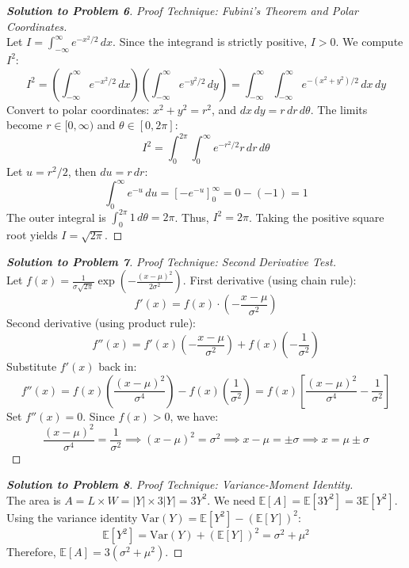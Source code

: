\documentclass[11pt, a4paper]{article}
\theoremstyle{definition}
\theoremstyle{remark}
\newcommand{\E}{\mathbb{E}}
\begin{document}
\begin{proof}[\textbf{Solution to Problem 6}]
\textit{Proof Technique: Fubini's Theorem and Polar Coordinates.} \\
Let $I = \int_{-\infty}^{\infty} e^{-x^2/2} \, dx$. Since the integrand is strictly positive, $I > 0$. We compute $I^2$:
\[ I^2 = \left( \int_{-\infty}^{\infty} e^{-x^2/2} \, dx \right) \left( \int_{-\infty}^{\infty} e^{-y^2/2} \, dy \right) = \int_{-\infty}^{\infty} \int_{-\infty}^{\infty} e^{-(x^2+y^2)/2} \, dx \, dy \]
Convert to polar coordinates: $x^2 + y^2 = r^2$, and $dx \, dy = r \, dr \, d\theta$. The limits become $r \in [0, \infty)$ and $\theta \in [0, 2\pi]$:
\[ I^2 = \int_{0}^{2\pi} \int_{0}^{\infty} e^{-r^2/2} r \, dr \, d\theta \]
Let $u = r^2/2$, then $du = r \, dr$:
\[ \int_{0}^{\infty} e^{-u} \, du = \left[ -e^{-u} \right]_0^\infty = 0 - (-1) = 1 \]
The outer integral is $\int_{0}^{2\pi} 1 \, d\theta = 2\pi$. Thus, $I^2 = 2\pi$. Taking the positive square root yields $I = \sqrt{2\pi}$.
\end{proof}

\begin{proof}[\textbf{Solution to Problem 7}]
\textit{Proof Technique: Second Derivative Test.} \\
Let $f(x) = \frac{1}{\sigma\sqrt{2\pi}} \exp\left(-\frac{(x-\mu)^2}{2\sigma^2}\right)$. 
First derivative (using chain rule):
\[ f'(x) = f(x) \cdot \left(-\frac{x-\mu}{\sigma^2}\right) \]
Second derivative (using product rule):
\[ f''(x) = f'(x)\left(-\frac{x-\mu}{\sigma^2}\right) + f(x)\left(-\frac{1}{\sigma^2}\right) \]
Substitute $f'(x)$ back in:
\[ f''(x) = f(x)\left(\frac{(x-\mu)^2}{\sigma^4}\right) - f(x)\left(\frac{1}{\sigma^2}\right) = f(x) \left[ \frac{(x-\mu)^2}{\sigma^4} - \frac{1}{\sigma^2} \right] \]
Set $f''(x) = 0$. Since $f(x) > 0$, we have:
\[ \frac{(x-\mu)^2}{\sigma^4} = \frac{1}{\sigma^2} \implies (x-\mu)^2 = \sigma^2 \implies x-\mu = \pm\sigma \implies x = \mu \pm \sigma \]
\end{proof}

\begin{proof}[\textbf{Solution to Problem 8}]
\textit{Proof Technique: Variance-Moment Identity.} \\
The area is $A = L \times W = |Y| \times 3|Y| = 3Y^2$. We need $\E[A] = \E[3Y^2] = 3\E[Y^2]$.
Using the variance identity $\text{Var}(Y) = \E[Y^2] - (\E[Y])^2$:
\[ \E[Y^2] = \text{Var}(Y) + (\E[Y])^2 = \sigma^2 + \mu^2 \]
Therefore, $\E[A] = 3(\sigma^2 + \mu^2)$.
\end{proof}
\end{document}
